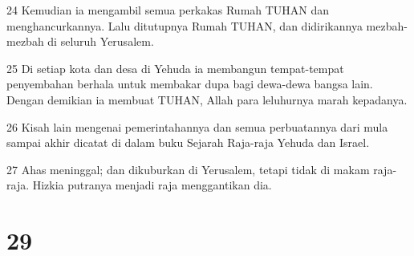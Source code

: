 \par 24 Kemudian ia mengambil semua perkakas Rumah TUHAN dan menghancurkannya. Lalu ditutupnya Rumah TUHAN, dan didirikannya mezbah-mezbah di seluruh Yerusalem.
\par 25 Di setiap kota dan desa di Yehuda ia membangun tempat-tempat penyembahan berhala untuk membakar dupa bagi dewa-dewa bangsa lain. Dengan demikian ia membuat TUHAN, Allah para leluhurnya marah kepadanya.
\par 26 Kisah lain mengenai pemerintahannya dan semua perbuatannya dari mula sampai akhir dicatat di dalam buku Sejarah Raja-raja Yehuda dan Israel.
\par 27 Ahas meninggal; dan dikuburkan di Yerusalem, tetapi tidak di makam raja-raja. Hizkia putranya menjadi raja menggantikan dia.

\chapter{29}

